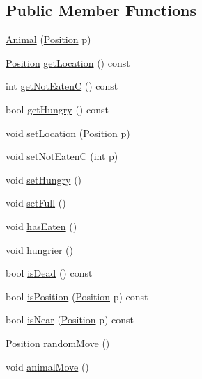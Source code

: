 \subsection*{Public Member Functions}
\begin{DoxyCompactItemize}
\item 
\mbox{\hyperlink{class_animal_aeaee0d014fa24437eb16bf18cc18043e}{Animal}} (\mbox{\hyperlink{class_position}{Position}} p)
\item 
\mbox{\hyperlink{class_position}{Position}} \mbox{\hyperlink{class_animal_ae5e867305b95d2faa30ea1182a5bbc32}{get\+Location}} () const
\item 
int \mbox{\hyperlink{class_animal_a0626ecd506a6207325f306b460c9b675}{get\+Not\+EatenC}} () const
\item 
bool \mbox{\hyperlink{class_animal_ac45667055a4d3fc254f32faffbc3c5ca}{get\+Hungry}} () const
\item 
void \mbox{\hyperlink{class_animal_ac61827dde571ed242d1e9010ed0e6eab}{set\+Location}} (\mbox{\hyperlink{class_position}{Position}} p)
\item 
void \mbox{\hyperlink{class_animal_a0bc097a6f9546779fcfc57f22a930a94}{set\+Not\+EatenC}} (int p)
\item 
void \mbox{\hyperlink{class_animal_abc2b03fe8afdb2a9339c2f139d97ca62}{set\+Hungry}} ()
\item 
void \mbox{\hyperlink{class_animal_a45299ed726067b2e1903ea09028a526d}{set\+Full}} ()
\item 
void \mbox{\hyperlink{class_animal_a1254bfc5dd49c9c4ba4b4a2e2f798943}{has\+Eaten}} ()
\item 
void \mbox{\hyperlink{class_animal_aa55a8fca7fa44c07cf201882bafd9762}{hungrier}} ()
\item 
bool \mbox{\hyperlink{class_animal_a4695446ddbce3ae05bc1d43301b6a3ff}{is\+Dead}} () const
\item 
bool \mbox{\hyperlink{class_animal_a183837eb1eefbcf853012a62c707e8b6}{is\+Position}} (\mbox{\hyperlink{class_position}{Position}} p) const
\item 
bool \mbox{\hyperlink{class_animal_a70b1c6a9b76c5dee3d9ecdb8410f6e56}{is\+Near}} (\mbox{\hyperlink{class_position}{Position}} p) const
\item 
\mbox{\hyperlink{class_position}{Position}} \mbox{\hyperlink{class_animal_a5c2c38bed13b17bbfd553c2a09bbfb6d}{random\+Move}} ()
\item 
void \mbox{\hyperlink{class_animal_a940eb3ed57dabe27518b0a78823594ae}{animal\+Move}} ()
\item 

\end{DoxyCompactItemize}
